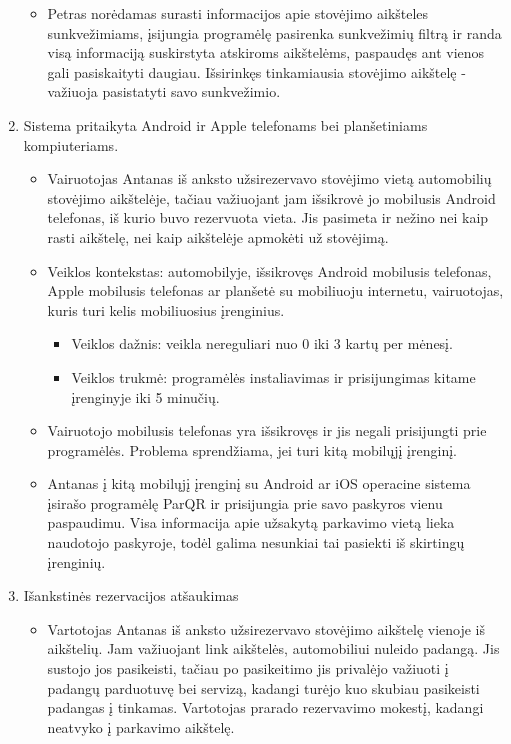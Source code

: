 \documentclass{VUMIFPSkursinis}
\begin{document}
\begin{enumerate}[label = \textbf{PV\arabic*.}]
\begin{itemize}[label={-}]
			\item Petras norėdamas surasti informacijos apie stovėjimo aikšteles sunkvežimiams, įsijungia programėlę pasirenka sunkvežimių filtrą ir randa visą informaciją suskirstyta atskiroms aikštelėms, paspaudęs ant vienos gali pasiskaityti daugiau. Išsirinkęs tinkamiausia stovėjimo aikštelę - važiuoja pasistatyti savo sunkvežimio.
			
		\end{itemize}
	\item Sistema pritaikyta Android ir Apple telefonams bei planšetiniams kompiuteriams.
		\begin{itemize}[label={-}]
			\item Vairuotojas Antanas iš anksto užsirezervavo stovėjimo vietą automobilių stovėjimo aikštelėje, tačiau važiuojant jam išsikrovė jo mobilusis Android telefonas, iš kurio buvo rezervuota vieta. Jis pasimeta ir nežino nei kaip rasti aikštelę, nei kaip aikštelėje apmokėti už stovėjimą.

			\item Veiklos kontekstas: automobilyje, išsikrovęs Android mobilusis telefonas, Apple mobilusis telefonas ar planšetė su mobiliuoju internetu, vairuotojas, kuris turi kelis mobiliuosius įrenginius.
				\begin{itemize}[label={$\bullet$}]
					\item Veiklos dažnis: veikla nereguliari nuo 0 iki 3 kartų per mėnesį.
					\item Veiklos trukmė: programėlės instaliavimas ir prisijungimas kitame įrenginyje iki 5 minučių.
				\end{itemize}
			\item Vairuotojo mobilusis telefonas yra išsikrovęs ir jis negali prisijungti prie programėlės. Problema sprendžiama, jei turi kitą mobilųjį įrenginį.

			\item Antanas į kitą mobilųjį įrenginį su Android ar iOS operacine sistema įsirašo programėlę ParQR ir prisijungia prie savo paskyros vienu paspaudimu. Visa informacija apie užsakytą parkavimo vietą lieka naudotojo paskyroje, todėl galima nesunkiai tai pasiekti iš skirtingų įrenginių.
			
		\end{itemize}
	\item Išankstinės rezervacijos atšaukimas
		\begin{itemize}[label={-}]
			\item Vartotojas Antanas iš anksto užsirezervavo stovėjimo aikštelę vienoje iš aikštelių. Jam važiuojant link aikštelės, automobiliui nuleido padangą. Jis sustojo jos pasikeisti, tačiau po pasikeitimo jis privalėjo važiuoti į padangų parduotuvę bei servizą, kadangi turėjo kuo skubiau pasikeisti padangas į tinkamas. Vartotojas prarado rezervavimo mokestį, kadangi neatvyko į parkavimo aikštelę.


\end{itemize}
\end{enumerate}
\end{document}
